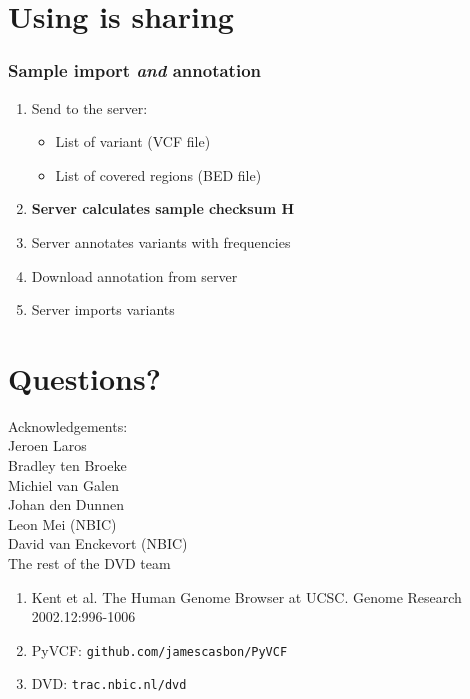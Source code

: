 \documentclass[slidestop]{beamer}
\begin{document}
\section{Using is sharing}

\begin{frame}
  \frametitle{Sample import {\em and} annotation}
  \begin{enumerate}
    \item<1-> Send to the server:
      \begin{itemize}
        \item List of variant (VCF file)
        \item List of covered regions (BED file)
      \end{itemize}
    \item<5-> {\bf Server calculates sample checksum H}
    \item<2-> Server annotates variants with frequencies 
    \item<3-> Download annotation from server
    \item<4-> Server imports variants 
  \end{enumerate}
\end{frame}

\section{Questions?}
\lastpagetemplate
\begin{frame}
  \begin{center}
    Acknowledgements:\\
    \vspace{0.8cm}
    Jeroen Laros\\
    Bradley ten Broeke\\
    Michiel van Galen\\
    Johan den Dunnen\\
    \vspace{0.8cm}
    Leon Mei (NBIC)\\
    David van Enckevort (NBIC)\\
    The rest of the DVD team
  \end{center}
  \vspace{1cm}
  {\tiny
    \begin{enumerate}
      \item Kent et al. The Human Genome Browser at UCSC. Genome Research 2002.12:996-1006
      \item PyVCF: \texttt{github.com/jamescasbon/PyVCF}
      \item DVD: \texttt{trac.nbic.nl/dvd}
    \end{enumerate}
  }
\end{frame}
\end{document}
